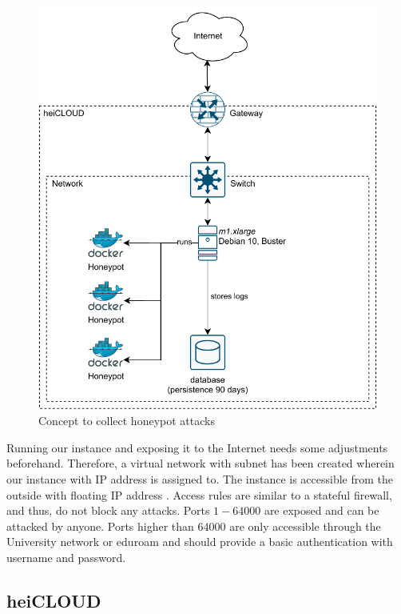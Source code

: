 \begin{figure}[h]
    \centering
    \includegraphics{figures/concept.pdf}
    \caption[Draft for data collection]{Concept to collect honeypot attacks}
    \label{fig:concept}
\end{figure}

Running our instance and exposing it to the Internet needs some adjustments beforehand.
Therefore, a virtual network with subnet  has been created wherein our instance with IP address  is assigned to.
The instance is accessible from the outside with floating IP address .
Access rules are similar to a stateful firewall, and thus, do not block any attacks.
Ports $1-64000$ are exposed and can be attacked by anyone.
Ports higher than $64000$ are only accessible through the University network  or eduroam  and should provide a basic authentication with username and password.

\subsection{heiCLOUD}
\label{subsec:heicloud}

